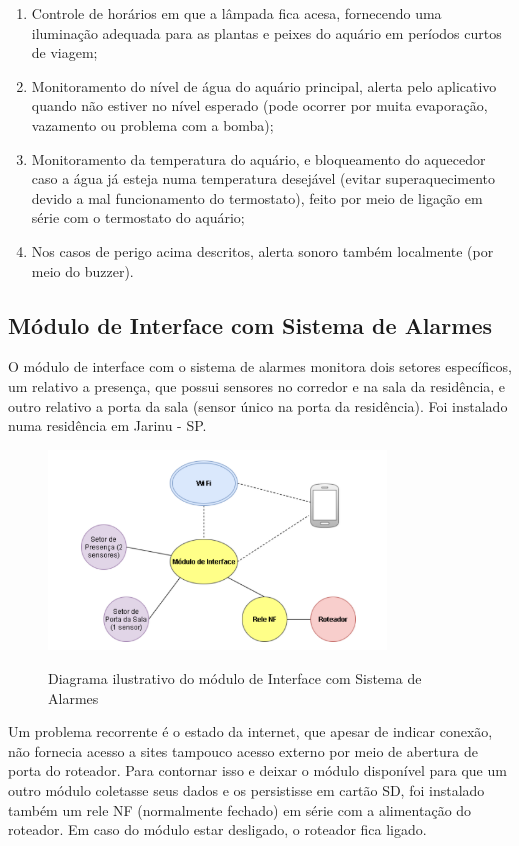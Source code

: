 \begin{enumerate}
	\item Controle de horários em que a lâmpada fica acesa, fornecendo uma iluminação adequada para as plantas e peixes do aquário em períodos curtos de viagem;
	\item Monitoramento do nível de água do aquário principal, alerta pelo aplicativo quando não estiver no nível esperado (pode ocorrer por muita evaporação, vazamento ou problema com a bomba);
	\item Monitoramento da temperatura do aquário, e bloqueamento do aquecedor caso a água já esteja numa temperatura desejável (evitar superaquecimento devido a mal funcionamento do termostato), feito por meio de ligação em série com o termostato do aquário;
	\item Nos casos de perigo acima descritos, alerta sonoro também localmente (por meio do buzzer).
	
\end{enumerate}

\subsection{Módulo de Interface com Sistema de Alarmes}

O módulo de interface com o sistema de alarmes monitora dois setores específicos, um relativo a presença, que possui sensores no corredor e na sala da residência, e outro relativo a porta da sala (sensor único na porta da residência). Foi instalado numa residência em Jarinu - SP.

\begin{figure}[H]
	\centering
	\caption{Diagrama ilustrativo do módulo de Interface com Sistema de Alarmes}
	\includegraphics[width=0.8\textwidth]{diagramaAlarme}
	\label{fig:diagramaAlarme}
\end{figure}

Um problema recorrente é o estado da internet, que apesar de indicar conexão, não fornecia acesso a sites tampouco acesso externo por meio de abertura de porta do roteador. Para contornar isso e deixar o módulo disponível para que um outro módulo coletasse seus dados e os persistisse em cartão SD, foi instalado também um rele NF (normalmente fechado) em série com a alimentação do roteador. Em caso do módulo estar desligado, o roteador fica ligado.

